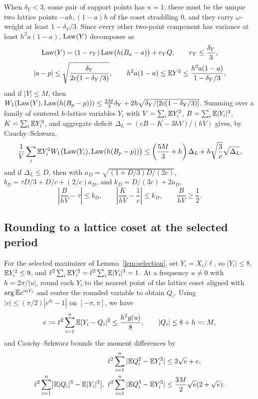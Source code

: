 When $\delta_Y<3$, some pair of support points has $n=1$; these must be the
unique two lattice points $-ah,(1-a)h$ of the coset straddling $0$, and they
carry $\omega$-weight at least $1-\delta_Y/3$. Since every other two-point
component has variance at least $h^2a(1-a)$, $\operatorname{Law}(Y)$ decomposes as
\begin{gather}
 \operatorname{Law}(Y)=(1-r_Y)\operatorname{Law}\bigl(h(B_a-a)\bigr)+r_YQ,\qquad r_Y\le\frac{\delta_Y}{3},\notag\\
 |a-p|\le\sqrt{\frac{\delta_Y}{2c(1-\delta_Y/3)}},\qquad
 h^2a(1-a)\le\mathbb E Y^2\le\frac{h^2a(1-a)}{1-\delta_Y/3},   \label{eq:nearest-law}
\end{gather}
and if $|Y|\le M$, then $W_1(\operatorname{Law}(Y),\operatorname{Law}(h(B_p-p)))\le\frac{2M}{3}\delta_Y+2h\sqrt{\delta_Y/[2c(1-\delta_Y/3)]}$.
Summing over a family of centered $h$-lattice variables $Y_i$ with
$V=\sum_i\mathbb E Y_i^2$, $B=\sum_i\mathbb E|Y_i|^3$, $K=\sum_i\mathbb E Y_i^3$, and aggregate
deficit $\Delta_L=(cB-K-3hV)/(hV)$ gives, by Cauchy--Schwarz,
\begin{equation}\label{eq:lattice-W1}
 \frac1V\sum_i\mathbb E Y_i^2 W_1\bigl(\operatorname{Law}(Y_i),\operatorname{Law}(h(B_p-p))\bigr)
 \le\left(\frac{5M}{3}+h\right)\Delta_L+h\sqrt{\frac3c}\sqrt{\Delta_L},
\end{equation}
and if $\Delta_L\le D$, then with $a_D=\sqrt{(1+D/3)D/(2c)}$,
$b_D=\tau D/3+D/c+(2/c)a_D$, and $k_D=D/(3c)+2a_D$,
\begin{equation}\label{eq:lattice-ratios}
 \left|\frac B{hV}-\tau\right|\le b_D,\qquad
 \left|\frac K{hV}-\frac1c\right|\le k_D,\qquad \frac B{hV}\ge\frac12.
\end{equation}

\subsection{Rounding to a lattice coset at the selected period}

For the selected maximizer of Lemma~\ref{lem:selection}, set $Y_i=X_i/\ell$,
so $|Y_i|\le8$, $\mathbb E Y_i^2\le9$, and $\ell^2\sum_i\mathbb E Y_i^2=\ell^2\sum_i\mathbb E|Y_i|^3=1$.
At a frequency $u\ne0$ with $h=2\pi/|u|$, round each $Y_i$ to the nearest
point of the lattice coset aligned with $\arg\mathbb E e^{\mathrm i uY_i}$ and center the
rounded variable to obtain $Q_i$. Using $|v|\le(\pi/2)|e^{\ii v}-1|$ on
$[-\pi,\pi]$, we have
\begin{equation}\label{eq:rounding}
 e:=\ell^2\sum_{i=1}^n\mathbb E|Y_i-Q_i|^2\le \frac{h^2g(u)}{8},\qquad |Q_i|\le8+h=:M,
\end{equation}
and Cauchy--Schwarz bounds the moment differences by
\begin{align}
 \ell^2\sum_{i=1}^n|\mathbb E Q_i^2-\mathbb E Y_i^2|&\le2\sqrt e+e,\notag\\
 \ell^2\sum_{i=1}^n\bigl|\mathbb E|Q_i|^3-\mathbb E|Y_i|^3\bigr|,\
 \ell^2\sum_{i=1}^n|\mathbb E Q_i^3-\mathbb E Y_i^3|
                &\le\frac{3M}{2}\sqrt e(2+\sqrt e).           \label{eq:rounding-moments}
\end{align}

